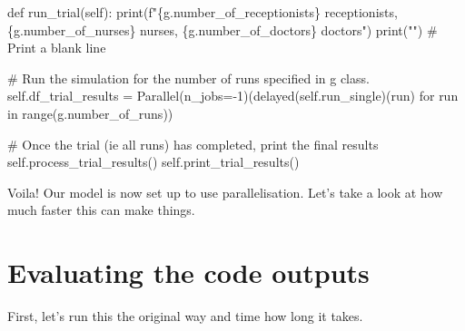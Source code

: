 \documentclass[
  letterpaper,
  DIV=11,
  numbers=noendperiod]{scrreprt}
\newenvironment{Shaded}{}{}
\newcommand{\BuiltInTok}[1]{\textcolor[rgb]{0.84,0.23,0.29}{#1}}
\newcommand{\CommentTok}[1]{\textcolor[rgb]{0.42,0.45,0.49}{#1}}
\newcommand{\ControlFlowTok}[1]{\textcolor[rgb]{0.84,0.23,0.29}{#1}}
\newcommand{\DecValTok}[1]{\textcolor[rgb]{0.00,0.36,0.77}{#1}}
\newcommand{\KeywordTok}[1]{\textcolor[rgb]{0.84,0.23,0.29}{#1}}
\newcommand{\NormalTok}[1]{\textcolor[rgb]{0.14,0.16,0.18}{#1}}
\newcommand{\OperatorTok}[1]{\textcolor[rgb]{0.14,0.16,0.18}{#1}}
\newcommand{\SpecialCharTok}[1]{\textcolor[rgb]{0.00,0.36,0.77}{#1}}
\newcommand{\SpecialStringTok}[1]{\textcolor[rgb]{0.01,0.18,0.38}{#1}}
\newcommand{\StringTok}[1]{\textcolor[rgb]{0.01,0.18,0.38}{#1}}
\newcommand{\VariableTok}[1]{\textcolor[rgb]{0.89,0.38,0.04}{#1}}
\begin{document}
\begin{Shaded}
\begin{Highlighting}[]
\KeywordTok{def}\NormalTok{ run\_trial(}\VariableTok{self}\NormalTok{):}
    \BuiltInTok{print}\NormalTok{(}\SpecialStringTok{f"}\SpecialCharTok{\{}\NormalTok{g}\SpecialCharTok{.}\NormalTok{number\_of\_receptionists}\SpecialCharTok{\}}\SpecialStringTok{ receptionists, }\SpecialCharTok{\{}\NormalTok{g}\SpecialCharTok{.}\NormalTok{number\_of\_nurses}\SpecialCharTok{\}}\SpecialStringTok{ nurses, }\SpecialCharTok{\{}\NormalTok{g}\SpecialCharTok{.}\NormalTok{number\_of\_doctors}\SpecialCharTok{\}}\SpecialStringTok{ doctors"}\NormalTok{)}
    \BuiltInTok{print}\NormalTok{(}\StringTok{""}\NormalTok{) }\CommentTok{\# Print a blank line}

    \CommentTok{\# Run the simulation for the number of runs specified in g class.}
    \VariableTok{self}\NormalTok{.df\_trial\_results }\OperatorTok{=}\NormalTok{ Parallel(n\_jobs}\OperatorTok{={-}}\DecValTok{1}\NormalTok{)(delayed(}\VariableTok{self}\NormalTok{.run\_single)(run) }\ControlFlowTok{for}\NormalTok{ run }\KeywordTok{in} \BuiltInTok{range}\NormalTok{(g.number\_of\_runs))}

    \CommentTok{\# Once the trial (ie all runs) has completed, print the final results}
    \VariableTok{self}\NormalTok{.process\_trial\_results()}
    \VariableTok{self}\NormalTok{.print\_trial\_results()}
\end{Highlighting}
\end{Shaded}

Voila! Our model is now set up to use parallelisation. Let's take a look
at how much faster this can make things.

\section{Evaluating the code outputs}\label{evaluating-the-code-outputs}

First, let's run this the original way and time how long it takes.
\end{document}
